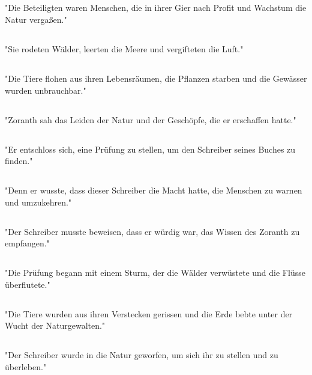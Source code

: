 \documentclass{article}
\begin{document}
\subsection{}
"Die Beteiligten waren Menschen, die in ihrer Gier nach Profit und Wachstum die Natur vergaßen."
\subsection{}
"Sie rodeten Wälder, leerten die Meere und vergifteten die Luft."
\subsection{}
"Die Tiere flohen aus ihren Lebensräumen, die Pflanzen starben und die Gewässer wurden unbrauchbar."
\subsection{}
"Zoranth sah das Leiden der Natur und der Geschöpfe, die er erschaffen hatte."
\subsection{}
"Er entschloss sich, eine Prüfung zu stellen, um den Schreiber seines Buches zu finden."
\subsection{}
"Denn er wusste, dass dieser Schreiber die Macht hatte, die Menschen zu warnen und umzukehren."
\subsection{}
"Der Schreiber musste beweisen, dass er würdig war, das Wissen des Zoranth zu empfangen."
\subsection{}
"Die Prüfung begann mit einem Sturm, der die Wälder verwüstete und die Flüsse überflutete."
\subsection{}
"Die Tiere wurden aus ihren Verstecken gerissen und die Erde bebte unter der Wucht der Naturgewalten."
\subsection{}
"Der Schreiber wurde in die Natur geworfen, um sich ihr zu stellen und zu überleben."
\end{document}
